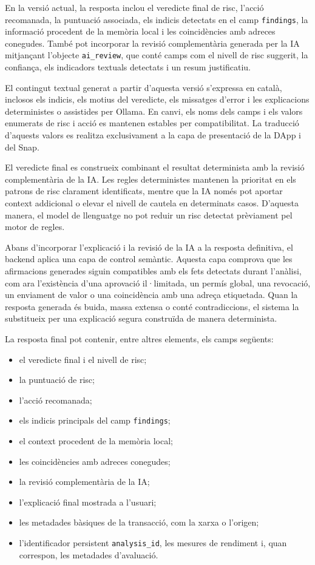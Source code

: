 En la versió actual, la resposta inclou el veredicte final de risc, l’acció recomanada, la puntuació associada, els indicis detectats en el camp \texttt{findings}, la informació procedent de la memòria local i les coincidències amb adreces conegudes. També pot incorporar la revisió complementària generada per la IA mitjançant l’objecte \texttt{ai\_review}, que conté camps com el nivell de risc suggerit, la confiança, els indicadors textuals detectats i un resum justificatiu.

El contingut textual generat a partir d’aquesta versió s’expressa en català, inclosos els indicis, els motius del veredicte, els missatges d’error i les explicacions deterministes o assistides per Ollama. En canvi, els noms dels camps i els valors enumerats de risc i acció es mantenen estables per compatibilitat. La traducció d’aquests valors es realitza exclusivament a la capa de presentació de la DApp i del Snap.

El veredicte final es construeix combinant el resultat determinista amb la revisió complementària de la IA. Les regles deterministes mantenen la prioritat en els patrons de risc clarament identificats, mentre que la IA només pot aportar context addicional o elevar el nivell de cautela en determinats casos. D’aquesta manera, el model de llenguatge no pot reduir un risc detectat prèviament pel motor de regles.

Abans d’incorporar l’explicació i la revisió de la IA a la resposta definitiva, el backend aplica una capa de control semàntic. Aquesta capa comprova que les afirmacions generades siguin compatibles amb els fets detectats durant l’anàlisi, com ara l’existència d’una aprovació il·limitada, un permís global, una revocació, un enviament de valor o una coincidència amb una adreça etiquetada. Quan la resposta generada és buida, massa extensa o conté contradiccions, el sistema la substitueix per una explicació segura construïda de manera determinista.

La resposta final pot contenir, entre altres elements, els camps següents:

\begin{itemize}
    \item el veredicte final i el nivell de risc;
    \item la puntuació de risc;
    \item l’acció recomanada;
    \item els indicis principals del camp \texttt{findings};
    \item el context procedent de la memòria local;
    \item les coincidències amb adreces conegudes;
    \item la revisió complementària de la IA;
    \item l’explicació final mostrada a l’usuari;
    \item les metadades bàsiques de la transacció, com la xarxa o l’origen;
    \item l'identificador persistent \texttt{analysis\_id}, les mesures de rendiment i, quan correspon, les metadades d'avaluació.
\end{itemize}

